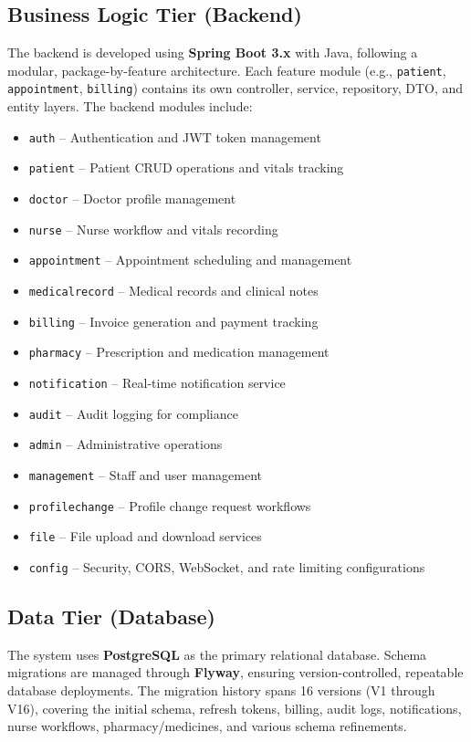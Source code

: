 \documentclass[conference]{IEEEtran}
\begin{document}
\subsection{Business Logic Tier (Backend)}
The backend is developed using \textbf{Spring Boot 3.x} with Java, following a modular, package-by-feature architecture. Each feature module (e.g., \texttt{patient}, \texttt{appointment}, \texttt{billing}) contains its own controller, service, repository, DTO, and entity layers. The backend modules include:
\begin{itemize}[leftmargin=*]
  \item \texttt{auth} -- Authentication and JWT token management
  \item \texttt{patient} -- Patient CRUD operations and vitals tracking
  \item \texttt{doctor} -- Doctor profile management
  \item \texttt{nurse} -- Nurse workflow and vitals recording
  \item \texttt{appointment} -- Appointment scheduling and management
  \item \texttt{medicalrecord} -- Medical records and clinical notes
  \item \texttt{billing} -- Invoice generation and payment tracking
  \item \texttt{pharmacy} -- Prescription and medication management
  \item \texttt{notification} -- Real-time notification service
  \item \texttt{audit} -- Audit logging for compliance
  \item \texttt{admin} -- Administrative operations
  \item \texttt{management} -- Staff and user management
  \item \texttt{profilechange} -- Profile change request workflows
  \item \texttt{file} -- File upload and download services
  \item \texttt{config} -- Security, CORS, WebSocket, and rate limiting configurations
\end{itemize}

\subsection{Data Tier (Database)}
The system uses \textbf{PostgreSQL} as the primary relational database. Schema migrations are managed through \textbf{Flyway}, ensuring version-controlled, repeatable database deployments. The migration history spans 16 versions (V1 through V16), covering the initial schema, refresh tokens, billing, audit logs, notifications, nurse workflows, pharmacy/medicines, and various schema refinements.
\end{document}
